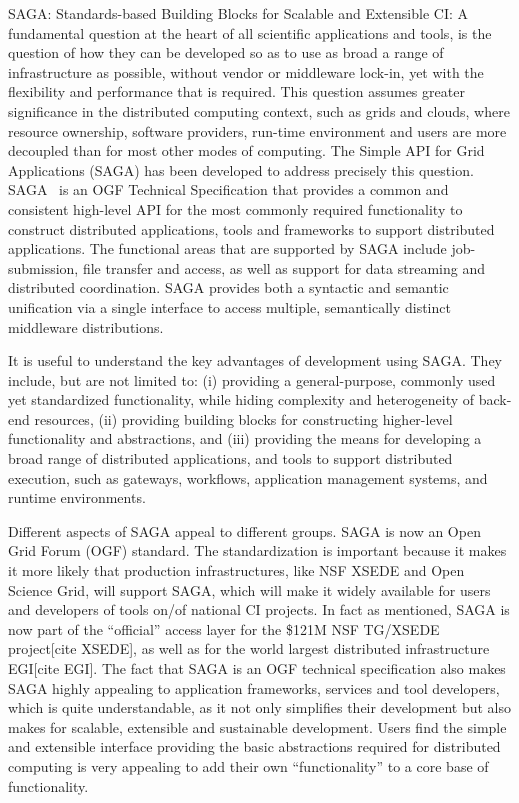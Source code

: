 \documentclass[]{svjour3}
\begin{document}
SAGA: Standards-based Building Blocks for Scalable and Extensible CI:
A fundamental question at the heart of all scientific applications and
tools, is the question of how they can be developed so as to use as
broad a range of infrastructure as possible, without vendor or
middleware lock-in, yet with the flexibility and performance that is
required. This question assumes greater significance in the distributed
computing context, such as grids and clouds, where resource ownership,
software providers, run-time environment and users are more decoupled
than for most other modes of computing. The Simple API for Grid
Applications (SAGA) has been developed to address precisely this
question. SAGA~\cite{saga_url} is an OGF Technical Specification that
provides a common and consistent high-level API for the most commonly
required functionality to construct distributed applications, tools
and frameworks to support distributed applications. The functional
areas that are supported by SAGA include job-submission, file transfer
and access, as well as support for data streaming and distributed
coordination. SAGA provides both a syntactic and semantic unification
via a single interface to access multiple, semantically distinct
middleware distributions.

It is useful to understand the key advantages of development using
SAGA. They include, but are not limited to: (i) providing a
general-purpose, commonly used yet standardized functionality, while
hiding complexity and heterogeneity of back-end resources, (ii)
providing building blocks for constructing higher-level functionality
and abstractions, and (iii) providing the means for developing a broad
range of distributed applications, and tools to support distributed
execution, such as gateways, workflows, application management
systems, and runtime environments.

Different aspects of SAGA appeal to different groups. SAGA is now an
Open Grid Forum (OGF) standard. The standardization is important
because it makes it more likely that production infrastructures, like
NSF XSEDE and Open Science Grid, will support SAGA, which will make it
widely available for users and developers of tools on/of national CI
projects. In fact as mentioned, SAGA is now part of the “official”
access layer for the \$121M NSF TG/XSEDE project[cite XSEDE], as well
as for the world largest distributed infrastructure EGI[cite EGI]. The
fact that SAGA is an OGF technical specification also makes SAGA
highly appealing to application frameworks, services and tool
developers, which is quite understandable, as it not only simplifies
their development but also makes for scalable, extensible and
sustainable development. Users find the simple and extensible
interface providing the basic abstractions required for distributed
computing is very appealing to add their own “functionality” to a core
base of functionality.
\end{document}
